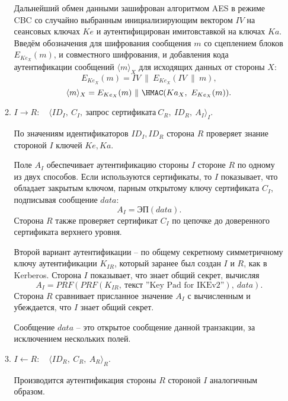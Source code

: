 \begin{enumerate}
\begin{enumerate}
                Дальнейший обмен данными зашифрован алгоритмом AES в режиме CBC со случайно выбранным инициализирующим вектором $IV$ на сеансовых ключах $Ke$ и аутентифицирован имитовставкой на ключах $Ka$. Введём обозначения для шифрования сообщения $m$ со сцеплением блоков $E_{Ke_X}(m)$, и совместного шифрования, и добавления кода аутентификации сообщений $\langle m \rangle_X$ для исходящих данных от стороны $X$:
                    \[  E_{Ke_X}(m) = IV ~\|~ E_{Ke_X}(IV ~\|~ m), \]
                    \[  \langle m \rangle_X = E_{Ke_X}(m) ~\|~ \HMAC(Ka_X, ~ E_{Ke_X}(m)). \]

            \item $I \rightarrow R$: ~ $\langle ID_I, ~ C_I, ~\text{запрос сертификата}~ C_R, ~ ID_R, ~ A_I \rangle_I$.

                По значениям идентификаторов $ID_I, ID_R$ сторона $R$ проверяет знание стороной $I$ ключей $Ke, Ka$.

                Поле $A_I$ обеспечивает аутентификацию стороны $I$ стороне $R$ по одному из двух способов. Если используются сертификаты, то $I$ показывает, что обладает закрытым ключом, парным открытому ключу сертификата $C_I$, подписывая сообщение $data$:
                    \[ A_I = \textrm{ЭП}(data). \]
                Сторона $R$ также проверяет сертификат $C_I$ по цепочке до доверенного сертификата верхнего уровня.

                Второй вариант аутентификации -- по общему секретному симметричному ключу аутентификации $K_{IR}$, который заранее был создан $I$ и $R$, как в Kerberos. Сторона $I$ показывает, что знает общий секрет, вычисляя
                    \[ A_I = PRF( PRF(K_{IR}, ~ \text{текст ''Key Pad for IKEv2''}), ~ data). \]
                Сторона $R$ сравнивает присланное значение $A_I$ с вычисленным и убеждается, что $I$ знает общий секрет.

                Сообщение $data$ -- это открытое сообщение данной транзакции, за исключением нескольких полей.

            \item $I \leftarrow R$: ~ $\langle ID_R, ~ C_R, ~ A_R \rangle_R$.

                Производится аутентификация стороны $R$ стороной $I$ аналогичным образом.
        \end{enumerate}


\end{enumerate}
